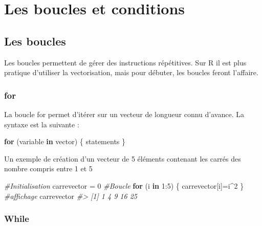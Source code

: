 \documentclass[
]{book}
\newenvironment{Shaded}{\begin{snugshade}}{\end{snugshade}}
\newcommand{\CommentTok}[1]{\textcolor[rgb]{0.56,0.35,0.01}{\textit{#1}}}
\newcommand{\ControlFlowTok}[1]{\textcolor[rgb]{0.13,0.29,0.53}{\textbf{#1}}}
\newcommand{\DecValTok}[1]{\textcolor[rgb]{0.00,0.00,0.81}{#1}}
\newcommand{\NormalTok}[1]{#1}
\newcommand{\OtherTok}[1]{\textcolor[rgb]{0.56,0.35,0.01}{#1}}
\newcommand{\SpecialCharTok}[1]{\textcolor[rgb]{0.00,0.00,0.00}{#1}}
\begin{document}
\hypertarget{les-boucles-et-conditions}{%
\section{Les boucles et conditions}\label{les-boucles-et-conditions}}

\hypertarget{les-boucles}{%
\subsection{Les boucles}\label{les-boucles}}

Les boucles permettent de gérer des instructions répétitives. Sur R il est plus pratique d'utiliser la vectorisation, mais pour débuter, les boucles feront l'affaire.

\hypertarget{for}{%
\subsubsection*{for}\label{for}}

La boucle for permet d'itérer sur un vecteur de longueur connu d'avance. La syntaxe est la suivante :

\begin{Shaded}
\begin{Highlighting}[]
\ControlFlowTok{for}\NormalTok{ (variable }\ControlFlowTok{in}\NormalTok{ vector) \{}
\NormalTok{  statements}
\NormalTok{\}}
\end{Highlighting}
\end{Shaded}

Un exemple de création d'un vecteur de 5 éléments contenant les carrés des nombre compris entre 1 et 5

\begin{Shaded}
\begin{Highlighting}[]
\CommentTok{\#Initialisation}
\NormalTok{carrevector }\OtherTok{=} \DecValTok{0}
\CommentTok{\#Boucle}
\ControlFlowTok{for}\NormalTok{ (i }\ControlFlowTok{in} \DecValTok{1}\SpecialCharTok{:}\DecValTok{5}\NormalTok{) \{}
\NormalTok{  carrevector[i]}\OtherTok{=}\NormalTok{i}\SpecialCharTok{\^{}}\DecValTok{2}
\NormalTok{\}}
\CommentTok{\#affichage}
\NormalTok{carrevector}
\CommentTok{\#\textgreater{} [1]  1  4  9 16 25}
\end{Highlighting}
\end{Shaded}

\hypertarget{while}{%
\subsubsection*{While}\label{while}}
\end{document}
